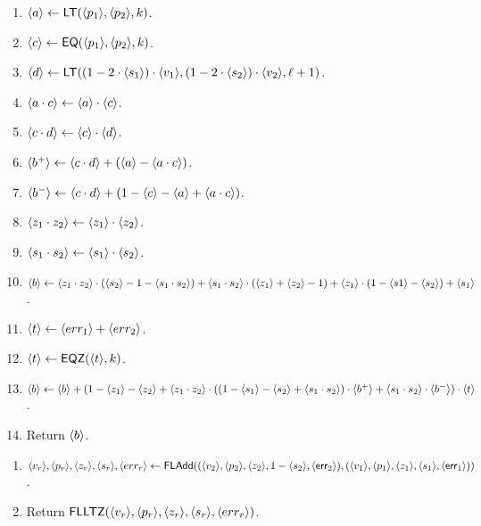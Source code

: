 \begin{enumerate}
\item $\langle a \rangle \leftarrow \mathsf{LT}(\langle p_1 \rangle,\langle p_2 \rangle,k)$.
\item $\langle c \rangle \leftarrow \mathsf{EQ}(\langle p_1 \rangle,\langle p_2 \rangle,k)$.
\item $\langle d \rangle \leftarrow \mathsf{LT}((1-2\cdot \langle s_1 \rangle) \cdot \langle v_1 \rangle,
	                           (1-2\cdot \langle s_2 \rangle) \cdot \langle v_2 \rangle,\ell+1)$.
\item $\langle a \cdot c \rangle \leftarrow \langle a \rangle\cdot \langle c \rangle$.
\item $\langle c \cdot d \rangle \leftarrow \langle c \rangle\cdot \langle d \rangle$.
\item $\langle b^+ \rangle \leftarrow \langle c \cdot d \rangle+(\langle a \rangle-\langle a \cdot c \rangle)$.
\item $\langle b^- \rangle \leftarrow \langle c \cdot d \rangle+(1-\langle c \rangle-\langle a \rangle+\langle a \cdot c \rangle)$.
\item $\langle z_1 \cdot z_2 \rangle \leftarrow \langle z_1 \rangle\cdot \langle z_2 \rangle$.
\item $\langle s_1 \cdot s_2 \rangle \leftarrow \langle s_1 \rangle\cdot \langle s_2 \rangle$.
\item $\langle b \rangle \leftarrow \langle z_1 \cdot z_2 \rangle \cdot (\langle s_2 \rangle-1-\langle s_1 \cdot s_2 \rangle)
	             + \langle s_1 \cdot s_2 \rangle \cdot (\langle z_1 \rangle+\langle z_2 \rangle-1)
		     + \langle z_1 \rangle\cdot (1-\langle s1 \rangle-\langle s_2 \rangle)
		     + \langle s_1 \rangle$.
\item $\langle t \rangle \leftarrow \langle err_1 \rangle + \langle err_2 \rangle$.
\item $\langle t \rangle \leftarrow \mathsf{EQZ}(\langle t \rangle, k)$.
\item $\langle b \rangle \leftarrow \langle b \rangle+
	(1-\langle z_1 \rangle-\langle z_2 \rangle+\langle z_1 \cdot z_2 \rangle \cdot 
	((1-\langle s_1 \rangle-\langle s_2 \rangle+\langle s_1 \cdot s_2 \rangle) \cdot \langle b^+ \rangle
	+\langle s_1 \cdot s_2 \rangle \cdot \langle b^- \rangle) \cdot \langle t \rangle$.
\item Return $\langle b \rangle$.
\end{enumerate}


\begin{enumerate}
\item $\langle v_r \rangle, \langle p_r \rangle, \langle z_r \rangle, \langle s_r \rangle, \langle err_r \rangle \leftarrow
\mathsf{FLAdd}(
	(\langle v_2 \rangle,\langle p_2 \rangle,\langle z_2 \rangle,1 -\langle s_2 \rangle,\langle \mathsf{err}_2 \rangle),
    (\langle v_1 \rangle,\langle p_1 \rangle,\langle z_1 \rangle,\langle s_1 \rangle,\langle \mathsf{err}_1 \rangle))$.
 \item Return $\mathsf{FLLTZ}(\langle v_r \rangle, \langle p_r \rangle, \langle z_r \rangle, \langle s_r \rangle, \langle err_r \rangle)$.   
\end{enumerate}

